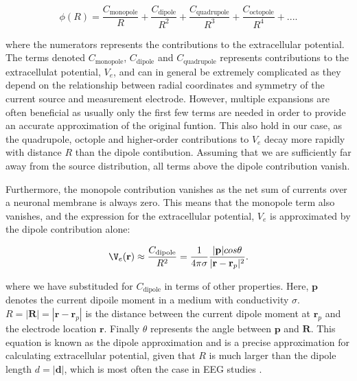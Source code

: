 \documentclass[a4paper, UKenglish, 11pt]{uiomaster}
\begin{document}
\begin{equation}
  \phi(R) = \frac{C_{\text{monopole}}}{R} + \frac{C_{\text{dipole}}}{R^2} + \frac{C_{\text{quadrupole}}}{R^3} + \frac{C_{\text{octopole}}}{R^4} + ... .
\label{eq:extracellular_potential}
\end{equation}

where the numerators represents the contributions to the extracellular potential. The terms denoted $C_\text{monopole}$, $C_\text{dipole}$ and $C_\text{quadrupole}$ represents contributions to the extracellulat potential, $V_e$, and can in general be extremely complicated as they depend on the relationship between radial coordinates and symmetry of the current source and measurement electrode. However, multiple expansions are often beneficial as usually only the first few terms are needed in order to provide an accurate approximation of the original funtion. This also hold in our case, as the quadrupole, octople and higher-order contributions to $V_e$ decay more rapidly with distance $R$ than the dipole contibution. Assuming that we are sufficiently far away from the source distribution, all terms above the dipole contribution vanish.

Furthermore, the monopole contribution vanishes as the net sum of currents over a neuronal membrane is always zero. This means that the monopole term also vanishes, and the expression for the extracellular potential, $V_e$ is approximated by the dipole contribution alone:


\begin{equation}
\V_e(\textbf{r}) \approx \frac{C_{\text{dipole}}}{R^2} = \frac{1}{4\pi\sigma}\frac{|\textbf{p}| cos \theta}{\lvert\textbf{r}-\textbf{r}_p\rvert^2}.
\label{eq:extracellular_potential_approximation}
\end{equation}

where we have substituded for $C_\text{dipole}$ in terms of other properties. Here, $\textbf{p}$ denotes the current dipoile moment in a medium with conductivity $\sigma$. $R = |\textbf{R}| = |\textbf{r} - \textbf{r}_p|$ is the distance between the current dipole moment at $\textbf{r}_p$ and the electrode location $\textbf{r}$. Finally $\theta$ represents the angle between $\textbf{p}$ and $\textbf{R}$. This equation is known as the dipole approximation and is a precise approximation for calculating extracellular potential, given that $R$ is much larger than the dipole length $d=|\textbf{d}|$, which is most often the case in EEG studies \cite{naess2021biophysically}.
\end{document}

